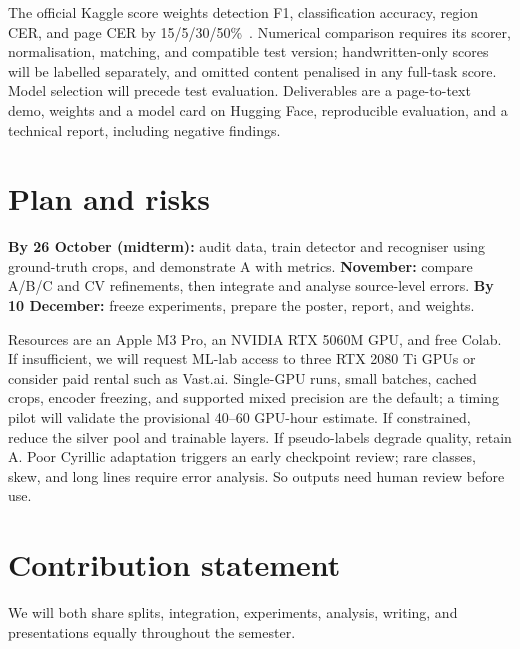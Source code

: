 \documentclass[english]{ucuproposal}
\begin{document}
The official Kaggle score weights detection F1, classification accuracy, region CER, and page CER by 15/5/30/50\%~\cite{kaggle2026}. Numerical comparison requires its scorer, normalisation, matching, and compatible test version; handwritten-only scores will be labelled separately, and omitted content penalised in any full-task score. Model selection will precede test evaluation. Deliverables are a page-to-text demo, weights and a model card on Hugging Face, reproducible evaluation, and a technical report, including negative findings.

\section{Plan and risks}
\textbf{By 26 October (midterm):} audit data, train detector and recogniser using ground-truth crops, and demonstrate A with metrics. \textbf{November:} compare A/B/C and CV refinements, then integrate and analyse source-level errors. \textbf{By 10 December:} freeze experiments, prepare the poster, report, and weights.

Resources are an Apple M3 Pro, an NVIDIA RTX 5060M GPU, and free Colab. If insufficient, we will request ML-lab access to three RTX 2080 Ti GPUs or consider paid rental such as Vast.ai. Single-GPU runs, small batches, cached crops, encoder freezing, and supported mixed precision are the default; a timing pilot will validate the provisional 40--60 GPU-hour estimate. If constrained, reduce the silver pool and trainable layers. If pseudo-labels degrade quality, retain A. Poor Cyrillic adaptation triggers an early checkpoint review; rare classes, skew, and long lines require error analysis. So outputs need human review before use.

\section{Contribution statement}
\begin{contributions}
\end{contributions}
We will both share splits, integration, experiments, analysis, writing, and presentations equally throughout the semester.

\ucuprintbibliography
\end{document}
